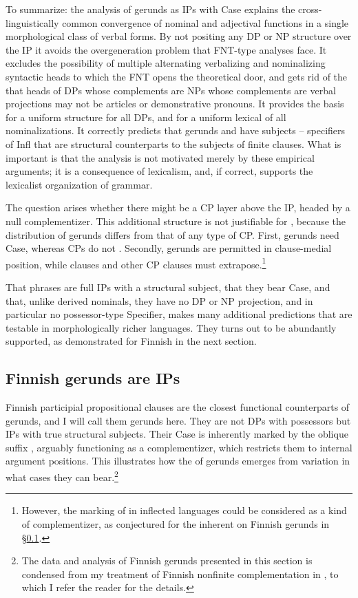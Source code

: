 \documentclass[output=paper,
modfonts
]{LSP/langsci}
\begin{document}
To summarize:  the analysis of gerunds as IPs with Case explains the cross-linguisti\-cally
common convergence of nominal and adjectival functions in a single morphological class of
verbal forms.  By not positing any DP or NP structure over the IP it avoids the overgeneration
problem that FNT-type analyses face.  It excludes the possibility of multiple alternating
verbalizing and nominalizing syntactic heads to which the FNT opens the theoretical door, and
gets rid of the  that heads of DPs whose complements are NPs whose complements are
verbal projections may not be articles or demonstrative pronouns.  It provides the basis for a
uniform structure for all DPs, and for a uniform lexical  of all nominalizations.  It
correctly predicts that gerunds and  have subjects – specifiers of Infl that are
structural counterparts to the subjects of finite clauses.  What is important is that the
analysis is not motivated merely by these empirical arguments; it is a consequence of
lexicalism, and, if correct, supports the lexicalist organization of grammar.

The question arises whether there might be a CP layer above the IP, headed by a null
complementizer.  This additional structure is not justifiable for , because the
distribution of gerunds differs from that of any type of CP.  First, gerunds need Case, whereas
CPs do not \citep{vergnaud1977}.  Secondly, gerunds are permitted in clause-medial position, while
clauses and other CP clauses must extrapose.\footnote{However, the  marking
  of  in inflected languages could be considered as a kind of complementizer, as
  conjectured for the inherent    on Finnish gerunds in \S\ref{finnsection}.}

That  phrases are full IPs with a structural subject, that they bear Case, and that,
unlike derived nominals, they have no DP or NP projection, and in particular no possessor-type
Specifier, makes many additional predictions that are testable in morphologically richer
languages.  They turns out to be abundantly supported, as demonstrated for Finnish in the next
section.

\subsection{Finnish gerunds are IPs}
\label{finnsection}
Finnish participial propositional  clauses are the closest functional counterparts of
 gerunds, and I will call them gerunds here.  They are not DPs with possessors but IPs
with true structural subjects.  Their Case is inherently marked by the oblique suffix ,
arguably functioning as a complementizer, which restricts them to internal argument
positions.  This illustrates how the  of gerunds emerges from variation in what cases
they can bear.\footnote{The data and analysis of Finnish gerunds presented in this section is
  condensed from my treatment of Finnish nonfinite complementation in \citet{kiparskyInPress}, to
  which I refer the reader for the details.}
\end{document}
